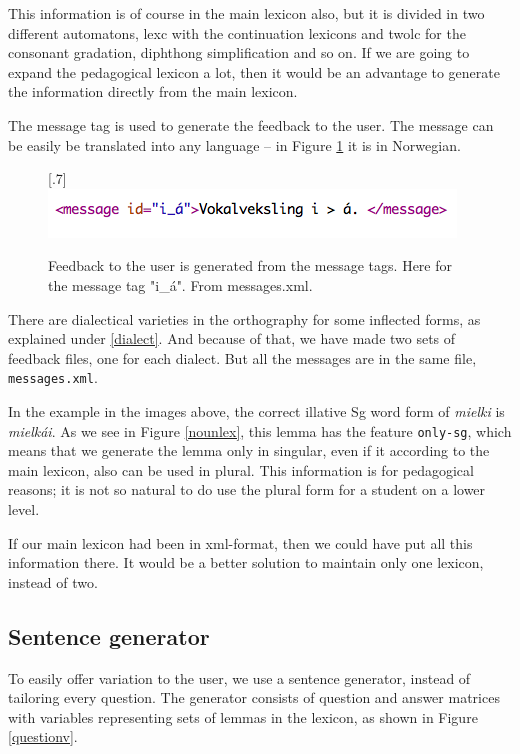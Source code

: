 \documentclass[a4paper,12pt]{article}
\begin{document}
This information is of course in the main lexicon also, but it is divided in two different automatons, lexc with the continuation lexicons and twolc for the consonant gradation, diphthong simplification and so on. If we are going to expand the pedagogical lexicon a lot, then it would be an advantage to generate the information directly from the main lexicon. 

The message tag is used to generate the feedback to the user. The message can be easily be translated into any language -- in Figure \ref{mess} it is in Norwegian.

\begin{figure}[htbp]
\begin{center}
\scalebox{.7}[.7]{\includegraphics{img/messages.png}}\\
\caption{Feedback to the user is generated from the message tags. Here for the message tag "i\_á". From messages.xml.}
\label{mess}
\end{center}
\end{figure}

There are dialectical varieties in the orthography for some inflected forms, as explained under \ref{dialect}. And because of that, we have made two sets of feedback files, one for each dialect. But all the messages are in the same file, \texttt{messages.xml}.

In the example in the images above, the correct illative Sg word form of \textit{mielki} is \textit{mielkái}. As we see in Figure \ref{nounlex}, this lemma has the feature \texttt{only-sg}, which means that we generate the lemma only in singular, even if it according to the main lexicon, also can be used in plural. This information is for pedagogical reasons; it is not so natural to do use the plural form for a student on a lower level.

If our main lexicon had been in xml-format, then we could have put all this information there. It would be a better solution to maintain only one lexicon, instead of two.

\subsection{Sentence generator}\label{set}
To easily offer variation to the user, we use a sentence generator, instead of tailoring every question. The generator consists of question and answer matrices with variables representing sets of lemmas in the lexicon, as shown in Figure \ref{questionv}.
\end{document}
